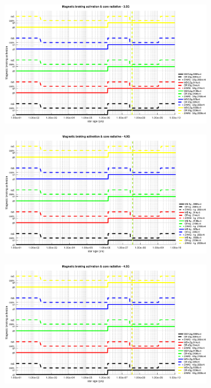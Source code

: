 \documentclass[fleqn,usenatbib]{mnras}
\begin{document}
\begin{figure}
    \centering
    \begin{subfigure}[h]{0.47\textwidth}
    \includegraphics[width=\textwidth]{figures/mb_act_3_5g.eps}
    \label{fig:subim31}
    \end{subfigure}
    \begin{subfigure}[h]{0.47\textwidth}
    \includegraphics[width=\textwidth]{figures/mb_act_4_0g.eps}
    \label{fig:subim32}
    \end{subfigure}
    \begin{subfigure}[h]{0.47\textwidth}
    \includegraphics[width=\textwidth]{figures/mb_act_4_5g.eps}

\end{subfigure}
\end{figure}
\end{document}
